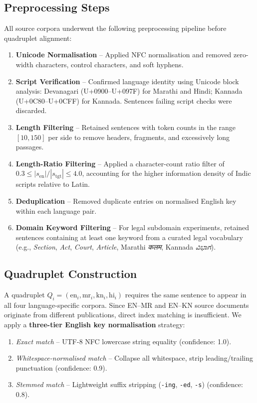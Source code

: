 \documentclass[conference,letterpaper]{IEEEtran}
\begin{document}
\subsection{Preprocessing Steps}
All source corpora underwent the following preprocessing pipeline before
quadruplet alignment:

\begin{enumerate}
    \item \textbf{Unicode Normalisation} -- Applied NFC normalisation and
    removed zero-width characters, control characters, and soft hyphens.
    \item \textbf{Script Verification} -- Confirmed language identity using
    Unicode block analysis: Devanagari (U+0900--U+097F) for Marathi and
    Hindi; Kannada (U+0C80--U+0CFF) for Kannada. Sentences failing
    script checks were discarded.
    \item \textbf{Length Filtering} -- Retained sentences with token
    counts in the range $[10, 150]$ per side to remove headers,
    fragments, and excessively long passages.
    \item \textbf{Length-Ratio Filtering} -- Applied a character-count
    ratio filter of $0.3 \leq |s_\text{en}| / |s_\text{tgt}| \leq 4.0$,
    accounting for the higher information density of Indic scripts
    relative to Latin.
    \item \textbf{Deduplication} -- Removed duplicate entries on
    normalised English key within each language pair.
    \item \textbf{Domain Keyword Filtering} -- For legal subdomain
    experiments, retained sentences containing at least one keyword
    from a curated legal vocabulary (e.g., \textit{Section},
    \textit{Act}, \textit{Court}, \textit{Article},
    Marathi \textit{कलम}, Kannada \textit{ವಿಭಾಗ}).
\end{enumerate}

\subsection{Quadruplet Construction}
A quadruplet $Q_i = (\text{en}_i, \text{mr}_i, \text{kn}_i, \text{hi}_i)$
requires the same sentence to appear in all four language-specific corpora.
Since EN--MR and EN--KN source documents originate from different
publications, direct index matching is insufficient. We apply a
\textbf{three-tier English key normalisation} strategy:

\begin{enumerate}
    \item \textit{Exact match} -- UTF-8 NFC lowercase string equality
    (confidence: 1.0).
    \item \textit{Whitespace-normalised match} -- Collapse all whitespace,
    strip leading/trailing punctuation (confidence: 0.9).
    \item \textit{Stemmed match} -- Lightweight suffix stripping
    (\texttt{-ing}, \texttt{-ed}, \texttt{-s}) (confidence: 0.8).
\end{enumerate}
\end{document}
